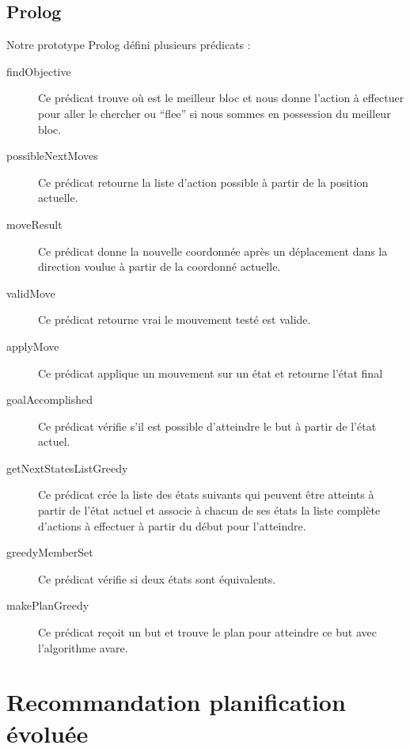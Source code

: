\documentclass[12pt,letterpaper]{article}
\begin{document}
\subsection{Prolog} %

Notre prototype Prolog défini plusieurs prédicats :

\begin{description}
  \item[findObjective] Ce prédicat trouve où est le meilleur bloc et nous donne l'action à effectuer pour aller le chercher ou ``flee'' si nous sommes en possession du meilleur bloc.
  \item[possibleNextMoves] Ce prédicat retourne la liste d'action possible à partir de la position actuelle.
  \item[moveResult] Ce prédicat donne la nouvelle coordonnée après un déplacement dans la direction voulue à partir de la coordonné actuelle.
  \item[validMove] Ce prédicat retourne vrai le mouvement testé est valide.
  \item[applyMove] Ce prédicat applique un mouvement sur un état et retourne l'état final
  \item[goalAccomplished] Ce prédicat vérifie s'il est possible d'atteindre le but à partir de l'état actuel.
  \item[getNextStatesListGreedy] Ce prédicat crée la liste des états suivants qui peuvent être atteints à partir de l'état actuel et associe à chacun de ses états la liste complète d'actions à effectuer à partir du début pour l'atteindre.
  \item[greedyMemberSet] Ce prédicat vérifie si deux états sont équivalents.
  \item[makePlanGreedy] Ce prédicat reçoit un but et trouve le plan pour atteindre ce but avec l'algorithme avare.
\end{description}

\section{Recommandation planification évoluée} %
\end{document}
